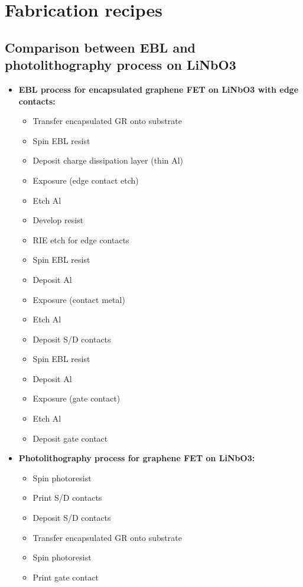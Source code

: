 \documentclass[double,12pt,1in]{beavtex}
\begin{document}
\pagebreak




\pagebreak

\appendix

\chapter{Fabrication recipes}

\section{Comparison between EBL and photolithography process on LiNbO3}
\begin{itemize}
    \item \textbf{EBL process for encapsulated graphene FET on LiNbO3 with edge contacts:}
    \begin{itemize}
    \item Transfer encapsulated GR onto substrate
    \item Spin EBL resist
    \item Deposit charge dissipation layer (thin Al)
    \item Exposure (edge contact etch)
    \item Etch Al
    \item Develop resist
    \item RIE etch for edge contacts
    \item Spin EBL resist
    \item Deposit Al
    \item Exposure (contact metal)
    \item Etch Al
    \item Deposit S/D contacts
    \item Spin EBL resist
    \item Deposit Al
    \item Exposure (gate contact)
    \item Etch Al
    \item Deposit gate contact
    \end{itemize}
    \item \textbf{Photolithography process for graphene FET on LiNbO3:}
    \begin{itemize}
    \item Spin photoresist
    \item Print S/D contacts
    \item Deposit S/D contacts
    \item Transfer encapsulated GR onto substrate
    \item Spin photoresist
    \item Print gate contact
    \end{itemize}
    \end{itemize}
    
\end{document}

